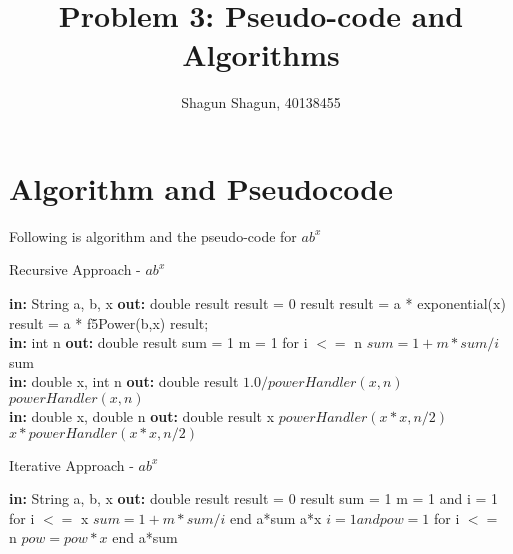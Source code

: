 \documentclass[10pt]{article}
\title{Problem 3: Pseudo-code and Algorithms}
\author{Shagun Shagun, 40138455}
\date{}
\begin{document}
\maketitle
\section{Algorithm and Pseudocode }
Following is algorithm and the pseudo-code for $ab^x$

\begin{algorithm}
\caption{Recursive Approach - $ab^x$ }
\begin{algorithmic}
\State \textbf{in: } String a, b, x
\State \textbf{out: } double result
\State  result = 0
    \Return result
\Else {}
 \State result = a * exponential(x)
    \Else 
    \State result = a * f5Power(b,x)
    \EndIf
\State 
\Return result;
\EndIf
\EndProcedure
\\
\State \textbf{in: } int n
\State \textbf{out: } double result
\State sum = 1
\State m = 1
\State for i $<=$ n 
\State $sum = 1+m*sum/i$
\State \Return sum
\EndProcedure
\\
\State \textbf{in: } double x, int n
\State \textbf{out: } double result
\State \Return $1.0/powerHandler(x,n)$
    \Else
\State \Return $powerHandler(x,n)$
\EndIf
\EndProcedure
\\
\State \textbf{in: } double x, double n
\State \textbf{out: } double result
\EndIf
{}
    \Return x
\EndIf
{}
\State \Return $powerHandler(x*x,  n/2)$
\Else
\State \Return $x * powerHandler(x*x,  n/2)$
\EndIf
\EndProcedure
\end{algorithmic}

\end{algorithm}

\begin{algorithm}
\caption{Iterative Approach -  $ab^x$ }
\begin{algorithmic}
\State \textbf{in: } String a, b, x
\State \textbf{out: } double result
\State  result = 0
    \Return result
\Else 
    \State sum = 1
    \State m = 1 and i = 1
    \State for i $<=$ x 
    \State $sum = 1+m*sum/i$
    \State end
\State \Return a*sum
    \Else 
        \EndIf
            \Return a*x
        \Else    
        \State $i=1 and pow = 1$
        \State for i $<=$ n 
        \State $pow = pow*x$
        \State end
        \State \Return a*sum
        \EndIf
\EndIf
\EndIf
\EndProcedure
\end{algorithmic}
\end{algorithm}
\end{document}
